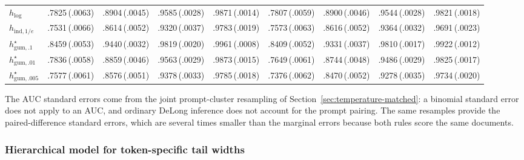 \documentclass[11pt]{article}
\newcommand{\mcse}[2]{\mbox{#1\,{\fontsize{7}{8}\selectfont(#2)}}}
\begin{document}
\begin{table}[htbp]
\begin{tabular}{@{}lrrrrrrrr@{}}
$h_{\log}$ & \mcse{.7825}{.0063} & \mcse{.8904}{.0045} & \mcse{.9585}{.0028} & \mcse{.9871}{.0014} & \mcse{.7807}{.0059} & \mcse{.8900}{.0046} & \mcse{.9544}{.0028} & \mcse{.9821}{.0018} \\
$h_{\mathrm{ind},1/e}$ & \mcse{.7531}{.0066} & \mcse{.8614}{.0052} & \mcse{.9320}{.0037} & \mcse{.9783}{.0019} & \mcse{.7573}{.0063} & \mcse{.8616}{.0052} & \mcse{.9364}{.0032} & \mcse{.9691}{.0023} \\
$h^\star_{\mathrm{gum},.1}$ & \mcse{.8459}{.0053} & \mcse{.9440}{.0032} & \mcse{.9819}{.0020} & \mcse{.9961}{.0008} & \mcse{.8409}{.0052} & \mcse{.9331}{.0037} & \mcse{.9810}{.0017} & \mcse{.9922}{.0012} \\
$h^\star_{\mathrm{gum},.01}$ & \mcse{.7836}{.0058} & \mcse{.8859}{.0046} & \mcse{.9563}{.0029} & \mcse{.9873}{.0015} & \mcse{.7649}{.0061} & \mcse{.8744}{.0048} & \mcse{.9486}{.0029} & \mcse{.9825}{.0017} \\
$h^\star_{\mathrm{gum},.005}$ & \mcse{.7577}{.0061} & \mcse{.8576}{.0051} & \mcse{.9378}{.0033} & \mcse{.9785}{.0018} & \mcse{.7376}{.0062} & \mcse{.8470}{.0052} & \mcse{.9278}{.0035} & \mcse{.9734}{.0020} \\
\bottomrule
\end{tabular}
\end{table}

The AUC standard errors come from the joint prompt-cluster resampling of
Section~\ref{sec:temperature-matched}: a binomial standard error does not apply to
an AUC, and ordinary DeLong inference does not account for the prompt pairing.
The same resamples provide the paired-difference standard errors, which are
several times smaller than the marginal errors because both rules score the
same documents.

\FloatBarrier
\subsubsection{Hierarchical model for token-specific tail widths}
\label{sec:width-pooling}
\end{document}
